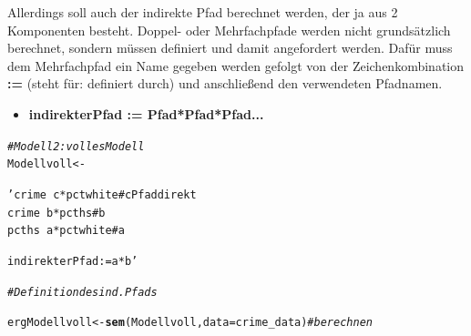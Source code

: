 \documentclass[a4paper]{article}\usepackage[]{graphicx}\usepackage[]{color}
\makeatletter
\newcommand{\hlstr}[1]{\textcolor[rgb]{0.192,0.494,0.8}{#1}}%
\newcommand{\hlcom}[1]{\textcolor[rgb]{0.678,0.584,0.686}{\textit{#1}}}%
\newcommand{\hlstd}[1]{\textcolor[rgb]{0.345,0.345,0.345}{#1}}%
\newcommand{\hlkwb}[1]{\textcolor[rgb]{0.69,0.353,0.396}{#1}}%
\newcommand{\hlkwc}[1]{\textcolor[rgb]{0.333,0.667,0.333}{#1}}%
\newcommand{\hlkwd}[1]{\textcolor[rgb]{0.737,0.353,0.396}{\textbf{#1}}}%
\newenvironment{kframe}{%
 \def\at@end@of@kframe{}%
 \ifinner\ifhmode%
  \def\at@end@of@kframe{\end{minipage}}%
  \begin{minipage}{\columnwidth}%
 \fi\fi%
 \def\FrameCommand##1{\hskip\@totalleftmargin \hskip-\fboxsep
 \colorbox{shadecolor}{##1}\hskip-\fboxsep
     \hskip-\linewidth \hskip-\@totalleftmargin \hskip\columnwidth}%
 \MakeFramed {\advance\hsize-\width
   \@totalleftmargin\z@ \linewidth\hsize
   \@setminipage}}%
 {\par\unskip\endMakeFramed%
 \at@end@of@kframe}
\newenvironment{knitrout}{}{} %
\makeatother
\begin{document}
Allerdings soll auch der indirekte Pfad berechnet werden, der ja aus 2 Komponenten besteht. Doppel- oder Mehrfachpfade werden nicht grundsätzlich berechnet, sondern müssen definiert und damit angefordert werden. Dafür muss dem Mehrfachpfad ein Name gegeben werden gefolgt von der Zeichenkombination \textbf{:=} (steht für: definiert durch) und anschließend den verwendeten Pfadnamen.
\begin{itemize}
  \item \textbf{indirekterPfad := Pfad*Pfad*Pfad...}
\end{itemize}
\begin{knitrout}
\color{fgcolor}\begin{kframe}
\begin{alltt}
\hlcom{# Modell 2: volles Modell}
\hlstd{Modellvoll} \hlkwb{<-} \hlstr{'crime ~ c*pctwhite # c Pfad direkt
               crime ~ b*pcths # b
               pcths ~ a*pctwhite # a

               indirekterPfad := a*b'} \hlcom{# Definition des ind. Pfads}

\hlstd{ergModellvoll} \hlkwb{<-} \hlkwd{sem}\hlstd{(Modellvoll,} \hlkwc{data} \hlstd{= crime_data)} \hlcom{# berechnen}


\end{alltt}
\end{kframe}
\end{knitrout}
\end{document}
